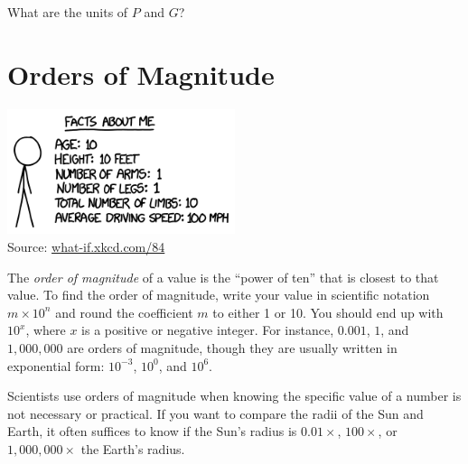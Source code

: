 \documentclass[11pt]{article}%
\begin{document}
What are the units of $P$ and $G$? 

\section{Orders of Magnitude}

\begin{center}
    \includegraphics[width=0.5\textwidth]{xkcd_oom.png} \\
    Source: \href{https://what-if.xkcd.com/84/}{what-if.xkcd.com/84}
\end{center}

The \emph{order of magnitude} of a value is the ``power of ten'' that is
closest to that value.
To find the order of magnitude, write your value in scientific notation
$m \times 10^n$ and round the coefficient $m$ to either 1 or 10.
You should end up with $10^x$, where $x$ is a positive or negative integer.
For instance, $0.001$, $1$, and $1,000,000$ are orders of magnitude, though
they are usually written in exponential form: $10^{-3}$, $10^0$, and $10^6$.


Scientists use orders of magnitude when knowing the specific value of a number
is not necessary or practical.
If you want to compare the radii of the Sun and Earth, it often suffices to
know if the Sun's radius is $0.01\times$, $100\times$, or $1,000,000\times$ the
Earth's radius.
\end{document}
